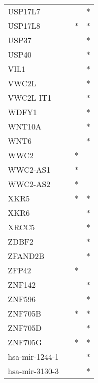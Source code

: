 \begin{longtable}{lccc}
USP17L7        &       &    &       * \\
USP17L8        &       &  * &       * \\
USP37          &       &    &       * \\
USP40          &       &    &       * \\
VIL1           &       &    &       * \\
VWC2L          &       &    &       * \\
VWC2L-IT1      &       &    &       * \\
WDFY1          &       &    &       * \\
WNT10A         &       &    &       * \\
WNT6           &       &    &       * \\
WWC2           &       &  * &         \\
WWC2-AS1       &       &  * &         \\
WWC2-AS2       &       &  * &         \\
XKR5           &       &  * &       * \\
XKR6           &       &    &       * \\
XRCC5          &       &    &       * \\
ZDBF2          &       &    &       * \\
ZFAND2B        &       &    &       * \\
ZFP42          &       &  * &         \\
ZNF142         &       &    &       * \\
ZNF596         &       &    &       * \\
ZNF705B        &       &  * &       * \\
ZNF705D        &       &    &       * \\
ZNF705G        &       &  * &       * \\
hsa-mir-1244-1 &       &    &       * \\
hsa-mir-3130-3 &       &    &       * \\
\end{longtable}
